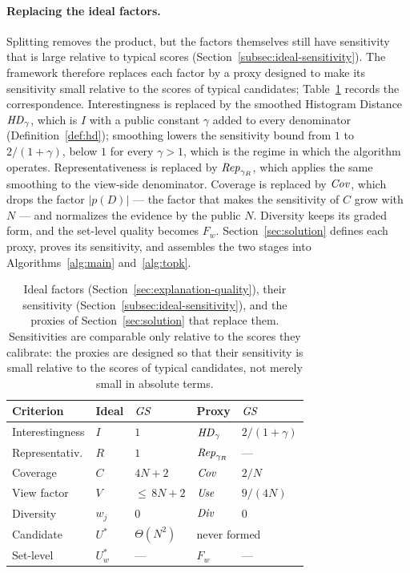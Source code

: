 \paragraph{Replacing the ideal factors.}
Splitting removes the product, but the factors themselves still have sensitivity that is large relative to typical scores (Section~\ref{subsec:ideal-sensitivity}).
The framework therefore replaces each factor by a proxy designed to make its sensitivity small relative to the scores of typical candidates; Table~\ref{tab:ideal-vs-proxy} records the correspondence.
Interestingness is replaced by the smoothed Histogram Distance $\mathit{HD}_\gamma$, which is $I$ with a public constant $\gamma$ added to every denominator (Definition~\ref{def:hd}); smoothing lowers the sensitivity bound from $1$ to $2/(1+\gamma)$, below $1$ for every $\gamma>1$, which is the regime in which the algorithm operates.
Representativeness is replaced by $\mathit{Rep}_{\gamma_R}$, which applies the same smoothing to the view-side denominator.
Coverage is replaced by $\mathit{Cov}$, which drops the factor $|p(D)|$ --- the factor that makes the sensitivity of $C$ grow with $N$ --- and normalizes the evidence by the public $N$.
Diversity keeps its graded form, and the set-level quality becomes $F_w$.
Section~\ref{sec:solution} defines each proxy, proves its sensitivity, and assembles the two stages into Algorithms~\ref{alg:main} and~\ref{alg:topk}.

\begin{table}[t]
\centering
\small
\setlength{\tabcolsep}{3.5pt}
\caption{Ideal factors (Section~\ref{sec:explanation-quality}), their sensitivity (Section~\ref{subsec:ideal-sensitivity}), and the proxies of Section~\ref{sec:solution} that replace them. Sensitivities are comparable only relative to the scores they calibrate: the proxies are designed so that their sensitivity is small relative to the scores of typical candidates, not merely small in absolute terms.}
\label{tab:ideal-vs-proxy}
\begin{tabular}{@{}lllll@{}}
\toprule
Criterion & Ideal & $\mathit{GS}$ & Proxy & $\mathit{GS}$ \\
\midrule
Interestingness    & $I$   & $1$        & $\mathit{HD}_\gamma$     & $2/(1{+}\gamma)$ \\
Representativ.     & $R$   & $1$        & $\mathit{Rep}_{\gamma_R}$ & --- \\
Coverage           & $C$   & $4N{+}2$   & $\mathit{Cov}$           & $2/N$ \\
View factor        & $V$   & ${\le}\,8N{+}2$ & $\mathit{Use}$      & $9/(4N)$ \\
Diversity          & $w_j$ & $0$        & $\mathit{Div}$          & $0$ \\
Candidate          & $U^*$ & $\Theta(N^2)$ & \multicolumn{2}{l}{never formed} \\
Set-level          & $U^*_w$ & ---      & $F_w$            & --- \\
\bottomrule
\end{tabular}
\end{table}

